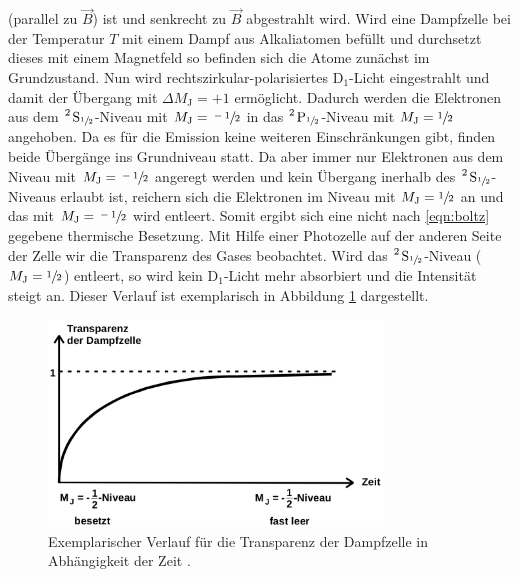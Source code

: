 (parallel zu $\vec{B}$) ist und senkrecht zu $\vec{B}$ abgestrahlt wird.
Wird eine Dampfzelle bei der Temperatur $T$ mit einem Dampf aus Alkaliatomen befüllt und durchsetzt
dieses mit einem Magnetfeld so befinden sich die Atome zunächst im Grundzustand. Nun wird rechtszirkular-polarisiertes
$\text{D}_1$-Licht eingestrahlt und damit der Übergang mit $\Delta M_\text{J} = +1$ ermöglicht. 
Dadurch werden die Elektronen aus dem $\ce{^2 S_{\sfrac{1}{2}}}$-Niveau mit $M_\text{J}=\sfrac{-1}{2}$ in das 
$\ce{^2 P_{\sfrac{1}{2}}}$-Niveau mit $M_\text{J}=\sfrac{1}{2}$ angehoben. Da es für die Emission
keine weiteren Einschränkungen gibt, finden beide Übergänge ins Grundniveau statt. Da aber immer nur
Elektronen aus dem Niveau mit $M_\text{J}=\sfrac{-1}{2}$ angeregt werden und kein Übergang inerhalb des
$\ce{^2 S_{\sfrac{1}{2}}}$-Niveaus erlaubt ist, reichern sich die Elektronen im Niveau mit 
$M_\text{J}=\sfrac{1}{2}$ an und das mit $M_\text{J}=\sfrac{-1}{2}$ wird entleert. Somit ergibt sich eine 
nicht nach \eqref{eqn:boltz} gegebene thermische Besetzung. 
Mit Hilfe einer Photozelle auf der anderen Seite der Zelle wir die Transparenz des Gases beobachtet.
Wird das $\ce{^2 S_{\sfrac{1}{2}}}$-Niveau ($M_\text{J}=\sfrac{1}{2}$) entleert, so wird kein $\text{D}_1$-Licht
mehr absorbiert und die Intensität steigt an. Dieser Verlauf ist exemplarisch in Abbildung \ref{fig:intensität}
dargestellt.
\begin{figure}
  \centering
  \includegraphics[height=5.5cm]{content/pictures/Transparenz.png}
  \caption{Exemplarischer Verlauf für die Transparenz der Dampfzelle in Abhängigkeit der Zeit \cite{anleitung}.}
  \label{fig:intensität}
\end{figure}

